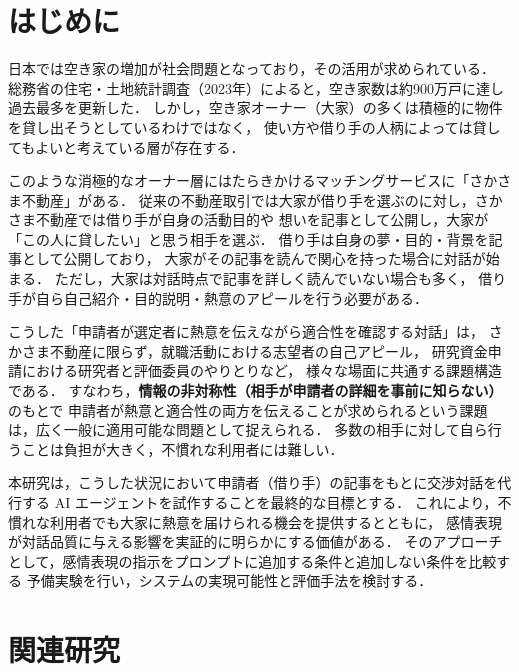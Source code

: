 \documentclass[dvipdfmx]{FITpaper}
\begin{document}
\maketitle

\section{はじめに}

日本では空き家の増加が社会問題となっており，その活用が求められている．
総務省の住宅・土地統計調査（2023年）によると，空き家数は約900万戸に達し過去最多を更新した．
しかし，空き家オーナー（大家）の多くは積極的に物件を貸し出そうとしているわけではなく，
使い方や借り手の人柄によっては貸してもよいと考えている層が存在する．

このような消極的なオーナー層にはたらきかけるマッチングサービスに「さかさま不動産」がある．
従来の不動産取引では大家が借り手を選ぶのに対し，さかさま不動産では借り手が自身の活動目的や
想いを記事として公開し，大家が「この人に貸したい」と思う相手を選ぶ．
借り手は自身の夢・目的・背景を記事として公開しており，
大家がその記事を読んで関心を持った場合に対話が始まる．
ただし，大家は対話時点で記事を詳しく読んでいない場合も多く，
借り手が自ら自己紹介・目的説明・熱意のアピールを行う必要がある．

こうした「申請者が選定者に熱意を伝えながら適合性を確認する対話」は，
さかさま不動産に限らず，就職活動における志望者の自己アピール，
研究資金申請における研究者と評価委員のやりとりなど，
様々な場面に共通する課題構造である．
すなわち，\textbf{情報の非対称性（相手が申請者の詳細を事前に知らない）}のもとで
申請者が熱意と適合性の両方を伝えることが求められるという課題は，広く一般に適用可能な問題として捉えられる．
多数の相手に対して自ら行うことは負担が大きく，不慣れな利用者には難しい．

本研究は，こうした状況において申請者（借り手）の記事をもとに交渉対話を代行する
AI エージェントを試作することを最終的な目標とする．
これにより，不慣れな利用者でも大家に熱意を届けられる機会を提供するとともに，
感情表現が対話品質に与える影響を実証的に明らかにする価値がある．
そのアプローチとして，感情表現の指示をプロンプトに追加する条件と追加しない条件を比較する
予備実験を行い，システムの実現可能性と評価手法を検討する．

\section{関連研究}
\end{document}
